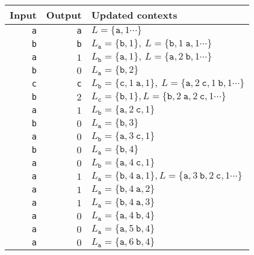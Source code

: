 \documentclass{article}
\begin{document}
\thispagestyle{empty}
  \begin{tabular}{rrl}
    Input & Output & Updated contexts\\
    \hline
    {\tt a} & {\tt a} & $L=\{\mathtt{a},1\cdots\}$\\
    {\tt b} & {\tt b} & $L_{\mathtt{a}}=\{\mathtt{b},1\},~L=\{\mathtt{b},1~\mathtt{a},1\cdots\}$\\
    {\tt a} &     $1$ & $L_{\mathtt{b}}=\{\mathtt{a},1\},~L=\{\mathtt{a},2~\mathtt{b},1\cdots\}$\\
    {\tt b} &     $0$ & $L_{\mathtt{a}}=\{\mathtt{b},2\}$\\
    {\tt c} & {\tt c} & $L_{\mathtt{b}}=\{\mathtt{c},1~\mathtt{a},1\},~L=\{\mathtt{a},2~\mathtt{c},1~\mathtt{b},1\cdots\}$\\
    {\tt b} &     $2$ & $L_{\mathtt{c}}=\{\mathtt{b},1\}, L=\{\mathtt{b},2~\mathtt{a},2~\mathtt{c},1\cdots\}$\\ 
    {\tt a} &     $1$ & $L_{\mathtt{b}}=\{\mathtt{a},2~\mathtt{c},1\}$\\
    {\tt b} &     $0$ & $L_{\mathtt{a}}=\{\mathtt{b},3\}$\\
    {\tt a} &     $0$ & $L_{\mathtt{b}}=\{\mathtt{a},3~\mathtt{c},1\}$\\
    {\tt b} &     $0$ & $L_{\mathtt{a}}=\{\mathtt{b},4\}$\\
    {\tt a} &     $0$ & $L_{\mathtt{b}}=\{\mathtt{a},4~\mathtt{c},1\}$\\
    {\tt a} &     $1$ & $L_{\mathtt{a}}=\{\mathtt{b},4~\mathtt{a},1\}, L=\{\mathtt{a},3~\mathtt{b},2~\mathtt{c},1\cdots\}$\\
    {\tt a} &     $1$ & $L_{\mathtt{a}}=\{\mathtt{b},4~\mathtt{a},2\}$\\
    {\tt a} &     $1$ & $L_{\mathtt{a}}=\{\mathtt{b},4~\mathtt{a},3\}$\\
    {\tt a} &     $0$ & $L_{\mathtt{a}}=\{\mathtt{a},4~\mathtt{b},4\}$\\
    {\tt a} &     $0$ & $L_{\mathtt{a}}=\{\mathtt{a},5~\mathtt{b},4\}$\\
    {\tt a} &     $0$ & $L_{\mathtt{a}}=\{\mathtt{a},6~\mathtt{b},4\}$
  \end{tabular}
\end{document}
